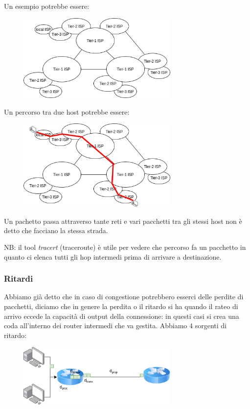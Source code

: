Un esempio potrebbe essere:
\begin{figure}[H]
    \centering
    \includegraphics[width=300px]{images/1_Introduzione/hierarchy.png}
\end{figure}

Un percorso tra due host potrebbe essere:
\begin{figure}[H]
    \centering
    \includegraphics[width=300px]{images/1_Introduzione/path.png}
\end{figure}
Un pachetto passa attraverso tante reti e vari pacchetti tra gli stessi host non è detto che facciano la stessa strada.

NB: il tool \emph{tracert} (traceroute) è utile per vedere che percorso fa un pacchetto in quanto ci elenca tutti gli hop intermedi prima di arrivare a destinazione.

\subsubsection{Ritardi}
Abbiamo già detto che in caso di congestione potrebbero esserci delle perdite di pacchetti, diciamo che in genere la perdita o il ritardo si ha quando il rateo di arrivo eccede la capacità di output della connessione: in questi casi si crea una coda all'interno dei router intermedi che va gestita.
Abbiamo 4 sorgenti di ritardo:
\begin{figure}[H]
    \centering
    \includegraphics[width=300px]{images/1_Introduzione/delay.png}
\end{figure}

